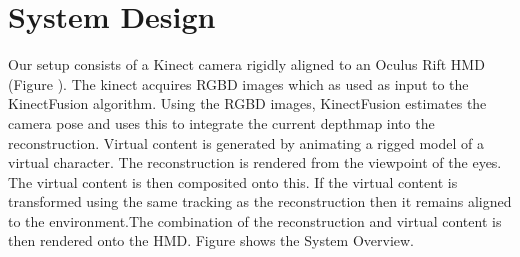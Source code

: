 \section{System Design}
Our setup consists of a Kinect camera rigidly aligned to an Oculus Rift HMD (Figure   ). The kinect acquires RGBD images which as used as input to the KinectFusion algorithm. Using the RGBD images, KinectFusion estimates the camera pose and uses this to integrate the current depthmap into the reconstruction. Virtual content is generated by animating a rigged model of a virtual character. The reconstruction is rendered from the viewpoint of the eyes. The virtual content is then composited onto this. If the virtual content is transformed using the same tracking as the reconstruction then it remains aligned to the environment.The combination of the reconstruction and virtual content is then rendered onto the HMD. Figure  shows the System Overview. 












